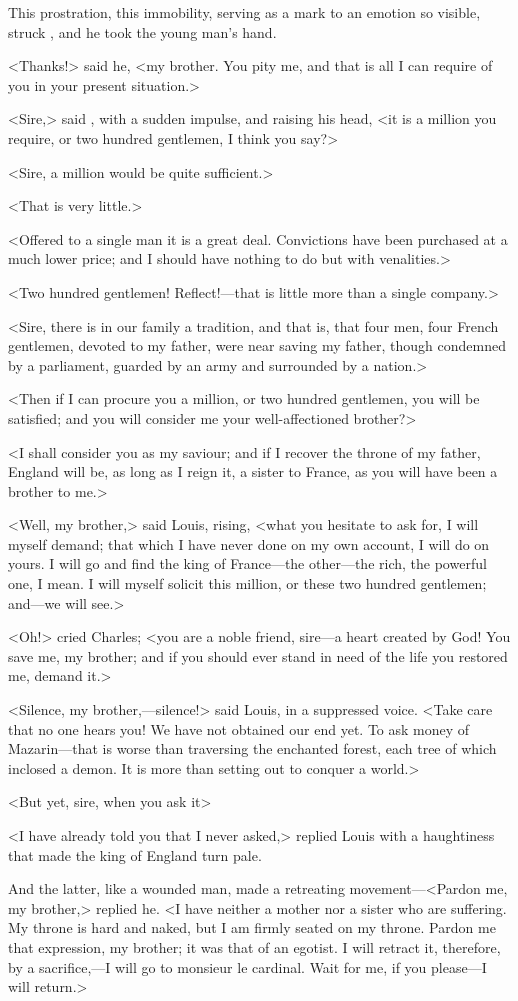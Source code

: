 This prostration, this immobility, serving as a mark to an emotion so visible, struck , and he took the young man's hand.

<Thanks!> said he, <my brother. You pity me, and that is all I can require of you in your present situation.>

<Sire,> said , with a sudden impulse, and raising his head, <it is a million you require, or two hundred gentlemen, I think you say?>

<Sire, a million would be quite sufficient.>

<That is very little.>

<Offered to a single man it is a great deal. Convictions have been purchased at a much lower price; and I should have nothing to do but with venalities.>

<Two hundred gentlemen! Reflect!—that is little more than a single company.>

<Sire, there is in our family a tradition, and that is, that four men, four French gentlemen, devoted to my father, were near saving my father, though condemned by a parliament, guarded by an army and surrounded by a nation.>

<Then if I can procure you a million, or two hundred gentlemen, you will be satisfied; and you will consider me your well-affectioned brother?>

<I shall consider you as my saviour; and if I recover the throne of my father, England will be, as long as I reign it, a sister to France, as you will have been a brother to me.>

<Well, my brother,> said Louis, rising, <what you hesitate to ask for, I will myself demand; that which I have never done on my own account, I will do on yours. I will go and find the king of France—the other—the rich, the powerful one, I mean. I will myself solicit this million, or these two hundred gentlemen; and—we will see.>

<Oh!> cried Charles; <you are a noble friend, sire—a heart created by God! You save me, my brother; and if you should ever stand in need of the life you restored me, demand it.>

<Silence, my brother,—silence!> said Louis, in a suppressed voice. <Take care that no one hears you! We have not obtained our end yet. To ask money of Mazarin—that is worse than traversing the enchanted forest, each tree of which inclosed a demon. It is more than setting out to conquer a world.>

<But yet, sire, when you ask it\longdash>

<I have already told you that I never asked,> replied Louis with a haughtiness that made the king of England turn pale.

And the latter, like a wounded man, made a retreating movement—<Pardon me, my brother,> replied he. <I have neither a mother nor a sister who are suffering. My throne is hard and naked, but I am firmly seated on my throne. Pardon me that expression, my brother; it was that of an egotist. I will retract it, therefore, by a sacrifice,—I will go to monsieur le cardinal. Wait for me, if you please—I will return.> 